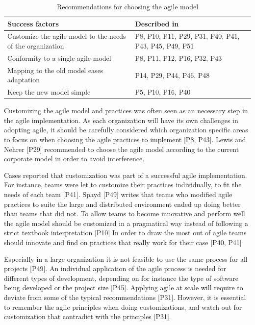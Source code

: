 \begin{table}[h]
    \centering
    \begin{tabular}{ >{\raggedright\arraybackslash}p{}
                     >{\raggedright\arraybackslash}p{} }
        \toprule
        Success factors  &  Described in \\
        \midrule
        Customize the agile model to the needs of the organization  &
                P8, P10, P11, P29, P31, P40, P41, P43, P45, P49, P51  \\
        Conformity to a single agile model  &
                P8, P11, P12, P16, P32, P43  \\
        Mapping to the old model eases adaptation  &
                P14, P29, P44, P46, P48  \\
        Keep the new model simple  &
                P5, P10, P16, P40  \\
        \bottomrule
    \end{tabular}
    \caption{Recommendations for choosing the agile model}
    \label{table:success_choosemodel}
\end{table}



Customizing the agile model and practices was often seen as an necessary step in
the agile implementation. As each organization will have its own challenges in
adopting agile, it should be carefully considered which organization specific
areas to focus on when choosing the agile practices to implement [P8, P43].
Lewis and Nehrer [P29] recommended to choose the agile model according to the
current corporate model in order to avoid interference.

Cases reported that customization was part of a successful agile implementation.
For instance, teams were let to customize their practices individually, to fit
the needs of each team [P41].
Spayd [P49] writes that teams who modified agile practices to suite the large and
distributed environment ended up doing better than teams that did not.
To allow teams to become innovative and perform well the agile model should be
customized in a pragmatical way instead of following a strict textbook
interpretation [P10]
In order to draw the most out of agile teams should innovate and find on
practices that really work for their case [P40, P41]

Especially in a large organization it is not feasible to use the same process
for all projects [P49]. An individual application of the agile process is needed
for different types of development, depending on for instance the type of
software being developed or the project size [P45].
Applying agile at scale will require to deviate from some of the typical
recommendations [P31]. However, it is essential to remember the agile principles
when doing customizations, and watch out for customization that contradict with
the principles [P31].

